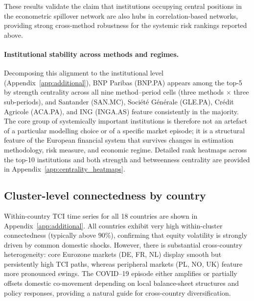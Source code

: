 These results validate the claim that institutions occupying central positions in the
econometric spillover network are also hubs in correlation-based networks, providing
strong cross-method robustness for the systemic risk rankings reported above.

\paragraph{Institutional stability across methods and regimes.}

Decomposing this alignment to the institutional level (Appendix~\ref{app:additional}),
BNP Paribas (BNP.PA) appears among the top-5 by strength centrality across all nine
method--period cells (three methods $\times$ three sub-periods), and Santander (SAN.MC),
Société Générale (GLE.PA), Crédit Agricole (ACA.PA), and ING (INGA.AS) feature
consistently in the majority. The core group of systemically important institutions is
therefore not an artefact of a particular modelling choice or of a specific market
episode; it is a structural feature of the European financial system that survives changes
in estimation methodology, risk measure, and economic regime. Detailed rank heatmaps
across the top-10 institutions and both strength and betweenness centrality are provided
in Appendix~\ref{app:centrality_heatmaps}.

\subsection{Cluster-level connectedness by country}\label{subsec:tci_clusters}

Within-country TCI time series for all 18 countries are shown in Appendix~\ref{app:additional}. All countries exhibit very high within-cluster connectedness (typically above $90\%$), confirming that equity volatility is strongly driven by common domestic shocks. However, there is substantial cross-country heterogeneity: core Eurozone markets (DE, FR, NL) display smooth but persistently high TCI paths, whereas peripheral markets (PL, NO, UK) feature more pronounced swings. The COVID--19 episode either amplifies or partially offsets domestic co-movement depending on local balance-sheet structures and policy responses, providing a natural guide for cross-country diversification.

